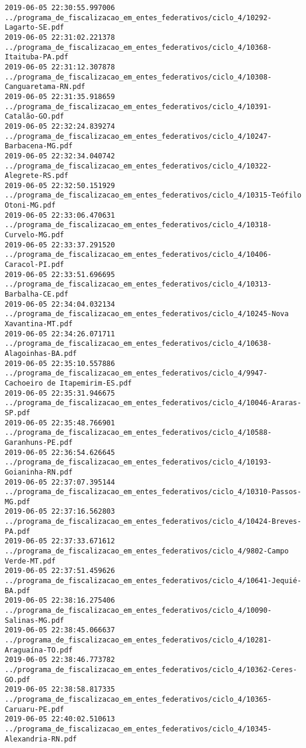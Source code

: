 \begin{lstlisting}
2019-06-05 22:30:55.997006 ../programa_de_fiscalizacao_em_entes_federativos/ciclo_4/10292-Lagarto-SE.pdf
2019-06-05 22:31:02.221378 ../programa_de_fiscalizacao_em_entes_federativos/ciclo_4/10368-Itaituba-PA.pdf
2019-06-05 22:31:12.307878 ../programa_de_fiscalizacao_em_entes_federativos/ciclo_4/10308-Canguaretama-RN.pdf
2019-06-05 22:31:35.918659 ../programa_de_fiscalizacao_em_entes_federativos/ciclo_4/10391-Catalão-GO.pdf
2019-06-05 22:32:24.839274 ../programa_de_fiscalizacao_em_entes_federativos/ciclo_4/10247-Barbacena-MG.pdf
2019-06-05 22:32:34.040742 ../programa_de_fiscalizacao_em_entes_federativos/ciclo_4/10322-Alegrete-RS.pdf
2019-06-05 22:32:50.151929 ../programa_de_fiscalizacao_em_entes_federativos/ciclo_4/10315-Teófilo Otoni-MG.pdf
2019-06-05 22:33:06.470631 ../programa_de_fiscalizacao_em_entes_federativos/ciclo_4/10318-Curvelo-MG.pdf
2019-06-05 22:33:37.291520 ../programa_de_fiscalizacao_em_entes_federativos/ciclo_4/10406-Caracol-PI.pdf
2019-06-05 22:33:51.696695 ../programa_de_fiscalizacao_em_entes_federativos/ciclo_4/10313-Barbalha-CE.pdf
2019-06-05 22:34:04.032134 ../programa_de_fiscalizacao_em_entes_federativos/ciclo_4/10245-Nova Xavantina-MT.pdf
2019-06-05 22:34:26.071711 ../programa_de_fiscalizacao_em_entes_federativos/ciclo_4/10638-Alagoinhas-BA.pdf
2019-06-05 22:35:10.557886 ../programa_de_fiscalizacao_em_entes_federativos/ciclo_4/9947-Cachoeiro de Itapemirim-ES.pdf
2019-06-05 22:35:31.946675 ../programa_de_fiscalizacao_em_entes_federativos/ciclo_4/10046-Araras-SP.pdf
2019-06-05 22:35:48.766901 ../programa_de_fiscalizacao_em_entes_federativos/ciclo_4/10588-Garanhuns-PE.pdf
2019-06-05 22:36:54.626645 ../programa_de_fiscalizacao_em_entes_federativos/ciclo_4/10193-Goianinha-RN.pdf
2019-06-05 22:37:07.395144 ../programa_de_fiscalizacao_em_entes_federativos/ciclo_4/10310-Passos-MG.pdf
2019-06-05 22:37:16.562803 ../programa_de_fiscalizacao_em_entes_federativos/ciclo_4/10424-Breves-PA.pdf
2019-06-05 22:37:33.671612 ../programa_de_fiscalizacao_em_entes_federativos/ciclo_4/9802-Campo Verde-MT.pdf
2019-06-05 22:37:51.459626 ../programa_de_fiscalizacao_em_entes_federativos/ciclo_4/10641-Jequié-BA.pdf
2019-06-05 22:38:16.275406 ../programa_de_fiscalizacao_em_entes_federativos/ciclo_4/10090-Salinas-MG.pdf
2019-06-05 22:38:45.066637 ../programa_de_fiscalizacao_em_entes_federativos/ciclo_4/10281-Araguaína-TO.pdf
2019-06-05 22:38:46.773782 ../programa_de_fiscalizacao_em_entes_federativos/ciclo_4/10362-Ceres-GO.pdf
2019-06-05 22:38:58.817335 ../programa_de_fiscalizacao_em_entes_federativos/ciclo_4/10365-Caruaru-PE.pdf
2019-06-05 22:40:02.510613 ../programa_de_fiscalizacao_em_entes_federativos/ciclo_4/10345-Alexandria-RN.pdf

\end{lstlisting}
